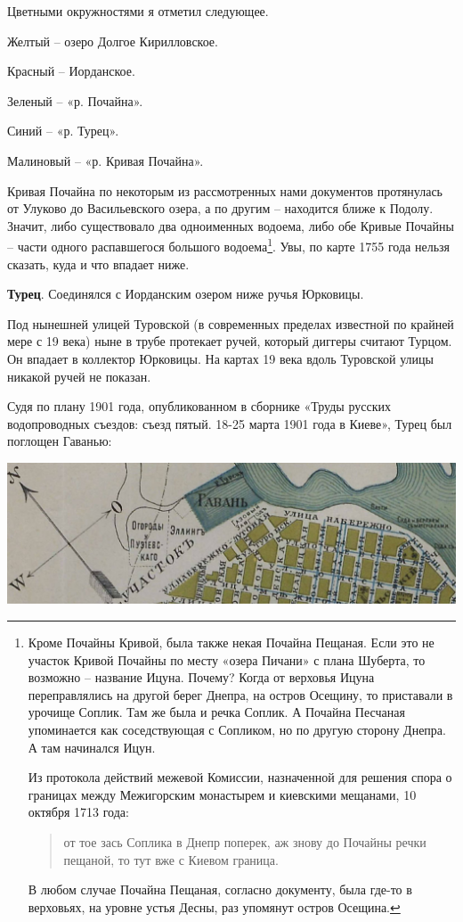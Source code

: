 Цветными окружностями я отметил следующее.

Желтый – озеро Долгое Кирилловское. 

Красный – Иорданское. 

Зеленый – «р. Почайна». 

Синий – «р. Турец». 

Малиновый – «р. Кривая Почайна».

Кривая Почайна по некоторым из рассмотренных нами документов протянулась от Улуково до Васильевского озера, а по другим – находится ближе к Подолу. Значит, либо существовало два одноименных водоема, либо обе Кривые Почайны – части одного распавшегося большого водоема\footnote{Кроме Почайны Кривой, была также некая Почайна Пещаная. Если это не участок Кривой Почайны по месту «озера Пичани» с плана Шуберта, то возможно – название Ицуна. Почему? Когда от верховья Ицуна переправлялись на другой берег Днепра, на остров Осещину, то приставали в урочище Соплик. Там же была и речка Соплик. А Почайна Песчаная упоминается как соседствующая с Сопликом, но по другую сторону Днепра. А там начинался Ицун.

Из протокола действий межевой Комиссии, назначенной для решения спора о границах между Межигорским монастырем и киевскими мещанами, 10 октября 1713 года:

\begin{quotation}
от тое зась Соплика в Днепр поперек, аж знову до Почайны речки пещаной, то тут вже с Киевом граница.
\end{quotation}

В любом случае Почайна Пещаная, согласно документу, была где-то в верховьях, на уровне устья Десны, раз упомянут остров Осещина.}. Увы, по карте 1755 года нельзя сказать, куда и что впадает ниже.

\textbf{Турец}. Соединялся с Иорданским озером ниже ручья Юрковицы. 

Под нынешней улицей Туровской (в современных пределах известной по крайней мере с 19 века) ныне в трубе протекает ручей, который диггеры считают Турцом. Он впадает в коллектор Юрковицы. На картах 19 века вдоль Туровской улицы никакой ручей не показан. 

Судя по плану 1901 года, опубликованном в сборнике «Труды русских водопроводных съездов: съезд пятый. 18-25 марта 1901 года в Киеве», Турец был поглощен Гаванью: 

\begin{center}
\includegraphics[width=\linewidth]{chast-colebanie-osnov/pochayna/1901-turec.jpg}
\end{center}

